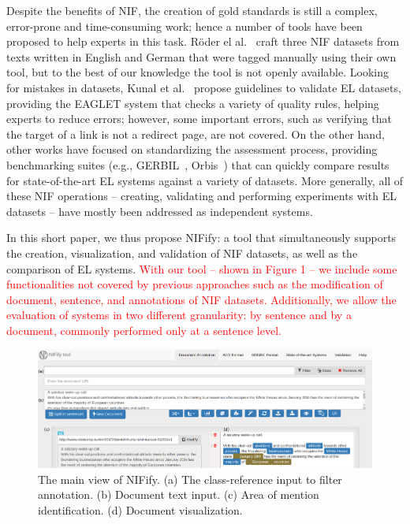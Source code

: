 \documentclass[sigconf]{acmart}
\begin{document}
Despite the benefits of NIF, the creation of gold standards is still a complex, error-prone and time-consuming work; hence a number of tools have been proposed to help experts in this task. R\"oder el al.~\cite{N3} craft three NIF datasets from texts written in English and German that were tagged manually using their own tool, but to the best of our knowledge the tool is not openly available. Looking for mistakes in datasets, Kunal et al.~\cite{Kunal2017} propose guidelines to validate EL datasets, providing the EAGLET system that checks a variety of quality rules, helping experts to reduce errors; however, some important errors, such as verifying that the target of a link is not a redirect page, are not covered. On the other hand, other works have focused on standardizing the assessment process, providing benchmarking suites (e.g., GERBIL~\cite{gerbil-2015}, Orbis~\cite{Orbis2018}) that can quickly compare results for state-of-the-art EL systems against a variety of datasets. More generally, all of these NIF operations -- creating, validating and performing experiments with EL datasets -- have mostly been addressed as independent systems. 

In this short paper, we thus propose NIFify: a tool that simultaneously supports the creation, visualization, and validation of NIF datasets, as well as the comparison of EL systems. \textcolor{red}{With our tool -- shown in Figure 1 -- we include some functionalities not covered by previous approaches such as the modification of document, sentence, and annotations of NIF datasets. Additionally, we allow the evaluation of systems in two different granularity: by sentence and by a document, commonly performed only at a sentence level. } 


\begin{figure}[tb]
\label{fig:sys}
\includegraphics[width=1\textwidth]{figs/screenshot}
\caption{The main view of NIFify. (a) The class-reference input to filter annotation. (b) Document text input. (c) Area of mention identification. (d) Document visualization.}
\end{figure}
\end{document}
